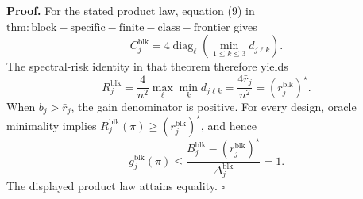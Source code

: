 \textbf{Proof.}
For the stated product law, equation (9) in \(\mathrm{thm:block-specific-finite-class-frontier}\) gives
\[
C_j^{\mathrm{blk}}
=4\operatorname{diag}_{\ell}
\left(\min_{1\le k\le3}d_{j\ell k}\right).
\]
The spectral-risk identity in that theorem therefore yields
\[
R_j^{\mathrm{blk}}
=\frac4{n^2}\max_\ell\min_kd_{j\ell k}
=\frac{4\bar r_j}{n^2}
=(r_j^{\mathrm{blk}})^\star.
\]
When \(b_j>\bar r_j\), the gain denominator is positive. For every design, oracle minimality implies \(R_j^{\mathrm{blk}}(\pi)\ge(r_j^{\mathrm{blk}})^\star\), and hence
\[
g_j^{\mathrm{blk}}(\pi)
\le
\frac{B_j^{\mathrm{blk}}-(r_j^{\mathrm{blk}})^\star}
{\Delta_j^{\mathrm{blk}}}=1.
\]
The displayed product law attains equality. \(\square\)